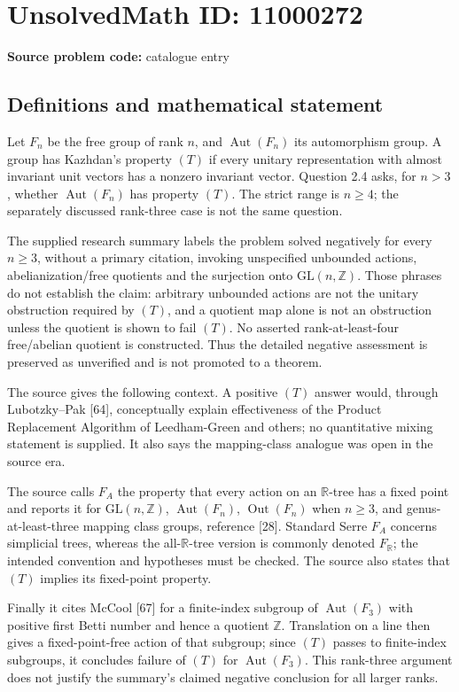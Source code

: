 \documentclass[11pt]{article}
\newcommand{\Z}{\mathbb{Z}}
\newcommand{\R}{\mathbb{R}}
\begin{document}
\section*{UnsolvedMath ID: 11000272}
\textbf{Source problem code:} catalogue entry
\subsection{Definitions and mathematical statement}
Let \(F_n\) be the free group of rank \(n\), and \(\operatorname{Aut}(F_n)\) its automorphism group. A group has Kazhdan's property \((T)\) if every unitary representation with almost invariant unit vectors has a nonzero invariant vector. Question 2.4 asks, for \(n>3\), whether \(\operatorname{Aut}(F_n)\) has property \((T)\). The strict range is \(n\ge4\); the separately discussed rank-three case is not the same question.

The supplied research summary labels the problem solved negatively for every \(n\ge3\), without a primary citation, invoking unspecified unbounded actions, abelianization/free quotients and the surjection onto \(\mathrm{GL}(n,\Z)\). Those phrases do not establish the claim: arbitrary unbounded actions are not the unitary obstruction required by \((T)\), and a quotient map alone is not an obstruction unless the quotient is shown to fail \((T)\). No asserted rank-at-least-four free/abelian quotient is constructed. Thus the detailed negative assessment is preserved as unverified and is not promoted to a theorem.

The source gives the following context. A positive \((T)\) answer would, through Lubotzky--Pak [64], conceptually explain effectiveness of the Product Replacement Algorithm of Leedham-Green and others; no quantitative mixing statement is supplied. It also says the mapping-class analogue was open in the source era.

The source calls \(F_A\) the property that every action on an \(\R\)-tree has a fixed point and reports it for \(\mathrm{GL}(n,\Z)\), \(\operatorname{Aut}(F_n)\), \(\operatorname{Out}(F_n)\) when \(n\ge3\), and genus-at-least-three mapping class groups, reference [28]. Standard Serre \(F_A\) concerns simplicial trees, whereas the all-\(\R\)-tree version is commonly denoted \(F_\R\); the intended convention and hypotheses must be checked. The source also states that \((T)\) implies its fixed-point property.

Finally it cites McCool [67] for a finite-index subgroup of \(\operatorname{Aut}(F_3)\) with positive first Betti number and hence a quotient \(\Z\). Translation on a line then gives a fixed-point-free action of that subgroup; since \((T)\) passes to finite-index subgroups, it concludes failure of \((T)\) for \(\operatorname{Aut}(F_3)\). This rank-three argument does not justify the summary's claimed negative conclusion for all larger ranks.
\end{document}
